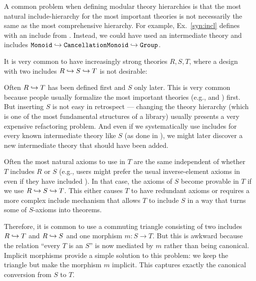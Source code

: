A common problem when defining modular theory hierarchies is that the most natural include-hierarchy for the most important theories is not necessarily the same as the most comprehensive hierarchy.
For example, Ex.~\ref{syn:incl} defines  with an include from .
Instead, we could have used an intermediate theory and includes $\operatorname{\mathtt{Monoid}}\hookrightarrow \operatorname{\mathtt{CancellationMonoid}}\hookrightarrow\operatorname{\mathtt{Group}}$.

It is very common to have increasingly strong theories $R,S,T$, where a design with two includes $R\hookrightarrow S\hookrightarrow T$ is not desirable:
\begin{compactitem}
 \item Often $R\hookrightarrow T$ has been defined first and $S$ only later.
   This is very common because people usually formalize the most important theories (e.g.,  and ) first.
   But inserting $S$ is not easy in retrospect --- changing the theory hierarchy (which is one of the most fundamental structures of a library) usually presents a very expensive refactoring problem.
   And even if we systematically use includes for every known intermediate theory like $S$ (as done in \cite{mathscheme}), we might later discover a new intermediate theory that should have been added.
 \item Often the most natural axioms to use in $T$ are the same independent of whether $T$ includes $R$ or $S$ (e.g., users might prefer the usual inverse-element axioms in  even if they have included ).
 In that case, the axioms of $S$ become provable in $T$ if we use $R\hookrightarrow S\hookrightarrow T$.
 This either causes $T$ to have redundant axioms or requires a more complex include mechanism that allows $T$ to include $S$ in a way that turns some of $S$-axioms into theorems.
\end{compactitem}

Therefore, it is common to use a commuting triangle consisting of two includes $R\hookrightarrow T$ and $R\hookrightarrow S$ and one morphism $m:S\to T$.
But this is awkward because the relation ``every $T$ is an $S$'' is now mediated by $m$ rather than being canonical.  
Implicit morphisms provide a simple solution to this problem: we keep the triangle but make the morphism $m$ implicit.
This captures exactly the canonical conversion from $S$ to $T$.

